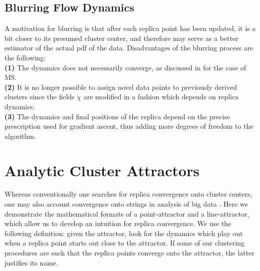 \documentclass[preprint,12pt]{elsarticle}
\begin{document}
\subsection{Blurring Flow Dynamics}
\label{blurring}
 A motivation for blurring is that after each replica point has been updated, it is a bit closer to its presumed cluster center, and therefore may serve as a better estimator of the actual pdf of the data. Disadvantages of the blurring process are the following:\\ 
\textbf{(1)} The dynamics does not necessarily converge, as discussed in \cite{rao2009mean} for the case of MS.  \\
\textbf{(2)} It is no longer possible to assign novel data points to previously derived clusters since the fields $\chi$ are modified in a fashion which depends on replica dynamics. \\
\textbf{(3)} The dynamics and final positions of the replica depend on the precise prescription used for gradient ascent, thus adding more degrees of freedom to the algorithm.


























\section{Analytic Cluster Attractors}
\label{analytic}
Whereas conventionally one searches for replica convergence onto cluster centers, one may also account convergence onto strings in analysis of big data \cite{weinstein2013}. Here we demonstrate the mathematical formats of a point-attractor and a line-attractor, which allow us to develop an intuition for replica convergence. We use the following definition: given the attractor, look for the dynamics which play out when a replica point starts out close to the attractor. If some of our clustering procedures are such that the replica points converge onto the attractor, the latter justifies its name.
\end{document}
